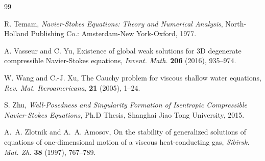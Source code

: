 \documentclass[11pt,reqno]{amsart}
\numberwithin{rk}{section}
\numberwithin{prop}{section}
\numberwithin{mydef}{section}
\numberwithin{lem}{section}
\numberwithin{equation}{section}
\numberwithin{thm}{section}
\begin{document}
\begin{thebibliography}{99}
	



 R. Temam, {\sl Navier-Stokes Equations: Theory and Numerical Analysis}, North-Holland Publishing Co.: Amsterdam-New York-Oxford, 1977.




 A. Vasseur and C. Yu, Existence of global weak solutions for 3D degenerate compressible Navier-Stokes equations, \textit{Invent. Math.}  \textbf{206} (2016),  935--974.





 W. Wang and C.-J. Xu, The Cauchy problem for viscous shallow water equations, \textit{Rev. Mat. Iberoamericana},  \textbf{21}  (2005), 1--24.










  S. Zhu,  \textit{Well-Posedness and Singularity Formation of Isentropic Compressible  Navier-Stokes Equations,}   Ph.D Thesis, Shanghai Jiao Tong University,  2015.


 A.~A. Zlotnik and A.~A. Amosov, On the stability of generalized solutions of equations of one-dimensional motion of a viscous heat-conducting gas, \textit{ Sibirsk. Mat. Zh.} \textbf{38} (1997), 767--789.


\end{thebibliography}
\end{document}
